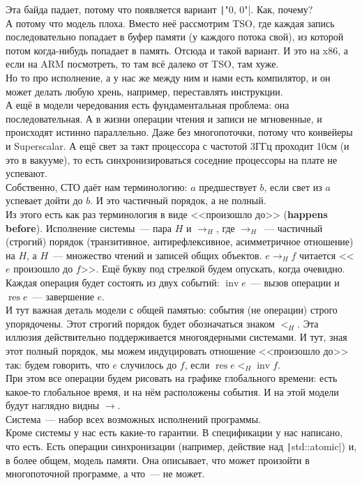 \documentclass{article}
\DeclareMathOperator{\inv}{inv}
\DeclareMathOperator{\res}{res}
\begin{document}
Эта байда падает, потому что появляется вариант \texttt|"0, 0"|. Как, почему?\\
А потому что модель плоха. Вместо неё рассмотрим TSO, где каждая запись последовательно попадает в буфер памяти (у каждого потока свой), из которой потом когда-нибудь попадает в память. Отсюда и такой вариант. И это на x86, а если на ARM посмотреть, то там всё далеко от TSO, там хуже.\\
Но то про исполнение, а у нас же между ним и нами есть компилятор, и он может делать любую хрень, например, переставлять инструкции.\\
А ещё в модели чередования есть фундаментальная проблема: она последовательная. А в жизни операции чтения и записи не мгновенные, и происходят истинно параллельно. Даже без многопоточки, потому что конвейеры и Superscalar. А ещё свет за такт процессора с частотой 3ГГц проходит 10см (и это в вакууме), то есть синхронизироваться соседние процессоры на плате не успевают.\\
Собственно, СТО даёт нам терминологию: $a$ предшествует $b$, если свет из $a$ успевает дойти до $b$. И это частичный порядок, а не полный.\\
Из этого есть как раз терминология в виде <<произошло до>> (\textbf{happens before}). Исполнение системы~--- пара $H$ и $\to_H$, где $\to_H$~--- частичный (строгий) порядок (транзитивное, антирефлексивное, асимметричное отношение) на $H$, а $H$~--- множество чтений и записей общих объектов. $e\to_H f$ читается <<$e$ произошло до $f$>>. Ещё букву под стрелкой будем опускать, когда очевидно. Каждая операция будет состоять  из двух событий: $\inv e$~--- вызов операции и $\res e$~--- завершение $e$.\\
И тут важная деталь модели с общей памятью: события (не операции) строго упорядочены. Этот строгий порядок будет обозначаться знаком $<_H$. Эта иллюзия действительно поддерживается многоядерными системами. И тут, зная этот полный порядок, мы можем индуцировать отношение <<произошло до>> так: будем говорить, что $e$ случилось до $f$, если $\res e<_H\inv f$.\\
При этом все операции будем рисовать на графике глобального времени: есть какое-то глобальное время, и на нём расположены события. И на этой модели будут наглядно видны $\to$.\\
Система~--- набор всех возможных исполнений программы.\\
Кроме системы у нас есть какие-то гарантии. В спецификации у нас написано, что есть. Есть операции синхронизации (например, действие над \texttt|std::atomic|) и, в более общем, модель памяти. Она описывает, что может произойти в многопоточной программе, а что~--- не может.\\
\end{document}
